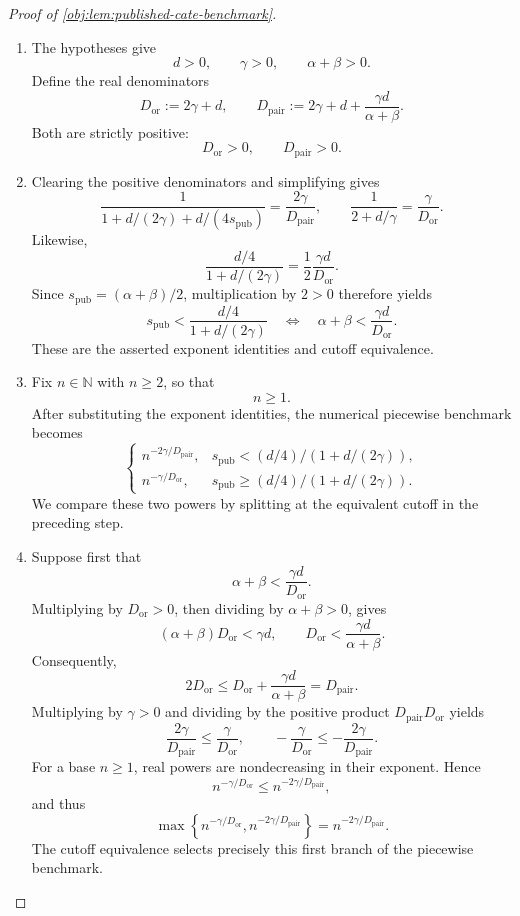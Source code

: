 \begin{proof}[Proof of \cref{obj:lem:published-cate-benchmark}]
\begin{enumerate}
\item The hypotheses give
\[
d>0,\qquad \gamma>0,\qquad \alpha+\beta>0.
\]
Define the real denominators
\[
D_{\mathrm{or}}:=2\gamma+d,
\qquad
D_{\mathrm{pair}}:=2\gamma+d+\frac{\gamma d}{\alpha+\beta}.
\]
Both are strictly positive:
\[
D_{\mathrm{or}}>0,\qquad D_{\mathrm{pair}}>0.
\]

\item Clearing the positive denominators and simplifying gives
\[
\frac{1}{1+d/(2\gamma)+d/(4s_{\mathrm{pub}})}
=\frac{2\gamma}{D_{\mathrm{pair}}},
\qquad
\frac{1}{2+d/\gamma}
=\frac{\gamma}{D_{\mathrm{or}}}.
\]
Likewise,
\[
\frac{d/4}{1+d/(2\gamma)}
=\frac{1}{2}\frac{\gamma d}{D_{\mathrm{or}}}.
\]
Since \(s_{\mathrm{pub}}=(\alpha+\beta)/2\), multiplication by \(2>0\) therefore yields
\[
s_{\mathrm{pub}}<\frac{d/4}{1+d/(2\gamma)}
\quad\Longleftrightarrow\quad
\alpha+\beta<\frac{\gamma d}{D_{\mathrm{or}}}.
\]
These are the asserted exponent identities and cutoff equivalence.

\item Fix \(n\in\mathbb N\) with \(n\ge2\), so that
\[
n\ge1.
\]
After substituting the exponent identities, the numerical piecewise benchmark becomes
\[
\begin{cases}
n^{-2\gamma/D_{\mathrm{pair}}},
& s_{\mathrm{pub}}<(d/4)/(1+d/(2\gamma)),\\
n^{-\gamma/D_{\mathrm{or}}},
& s_{\mathrm{pub}}\ge(d/4)/(1+d/(2\gamma)).
\end{cases}
\]
We compare these two powers by splitting at the equivalent cutoff in the preceding step.

\item Suppose first that
\[
\alpha+\beta<\frac{\gamma d}{D_{\mathrm{or}}}.
\]
Multiplying by \(D_{\mathrm{or}}>0\), then dividing by \(\alpha+\beta>0\), gives
\[
(\alpha+\beta)D_{\mathrm{or}}<\gamma d,
\qquad
D_{\mathrm{or}}<\frac{\gamma d}{\alpha+\beta}.
\]
Consequently,
\[
2D_{\mathrm{or}}
\le D_{\mathrm{or}}+\frac{\gamma d}{\alpha+\beta}
=D_{\mathrm{pair}}.
\]
Multiplying by \(\gamma>0\) and dividing by the positive product
\(D_{\mathrm{pair}}D_{\mathrm{or}}\) yields
\[
\frac{2\gamma}{D_{\mathrm{pair}}}
\le\frac{\gamma}{D_{\mathrm{or}}},
\qquad
-\frac{\gamma}{D_{\mathrm{or}}}
\le-\frac{2\gamma}{D_{\mathrm{pair}}}.
\]
For a base \(n\ge1\), real powers are nondecreasing in their exponent. Hence
\[
n^{-\gamma/D_{\mathrm{or}}}
\le n^{-2\gamma/D_{\mathrm{pair}}},
\]
and thus
\[
\max\left\{
n^{-\gamma/D_{\mathrm{or}}},
n^{-2\gamma/D_{\mathrm{pair}}}
\right\}
=n^{-2\gamma/D_{\mathrm{pair}}}.
\]
The cutoff equivalence selects precisely this first branch of the piecewise benchmark.


\end{enumerate}
\end{proof}
